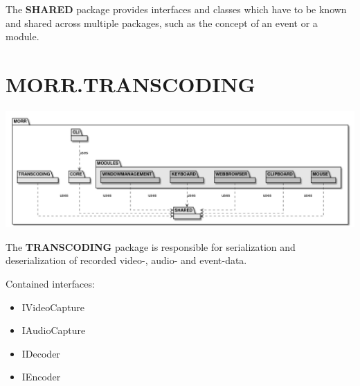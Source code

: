 The \textbf{SHARED} package provides interfaces and classes which have to be known and shared across multiple packages, such as the concept of an event or a module.

\begin{packif}
\end{packif}

\begin{packclass}
\end{packclass}

\newpage
\section{MORR.TRANSCODING}

\begin{center}
    \includegraphics[width=1.0\textwidth]{resources/Packages/AllPackages.png}
\end{center}

The \textbf{TRANSCODING} package is responsible for serialization and deserialization of recorded video-, audio- and event-data. 

Contained interfaces:
\begin{itemize}
\item IVideoCapture
\item IAudioCapture
\item IDecoder
\item IEncoder
\end{itemize}

